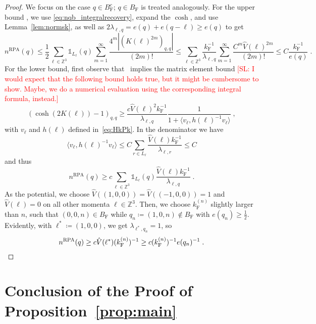 \documentclass[12pt,a4paper]{article}
\numberwithin{equation}{section}
\newcommand{\ZZZ}{\mathbb{Z}}
\newcommand{\1}{\mathbb{I}}
\newcommand{\F}{\mathrm{F}}
\newcommand{\RPA}{\mathrm{RPA}}
\newcommand{\Zstar}{\mathbb{Z}^3} %
\newcommand{\Z}{\mathbb{Z}}
\newcommand{\half}{\frac{1}{2}}
\theoremstyle{plain}
\theoremstyle{definition}
\theoremstyle{remark}
\theoremstyle{plain}
\theoremstyle{definition}
\theoremstyle{remark}
\begin{document}
\begin{proof}
We focus on the case $ q \in B_{\F}^c $; $ q \in B_{\F} $ is treated analogously. For the upper bound , we use \eqref{eq:nqb_integralrecovery}, expand the $ \cosh $, and use Lemma~\ref{lem:normsk}, as well as $ 2 \lambda_{\ell,q} = e(q) + e(q - \ell) \ge e(q) $ to get
\begin{equation}
	n^{\RPA}(q)
	\le \half \sum_{\ell \in \Zstar} \mathds{1}_{L_\ell}(q) \sum_{m=1}^{\infty} \frac{4^m |(K(\ell)^{2m})_{q,q}|}{(2m)!}
	\le \sum_{\ell \in \Zstar} \frac{k_{\F}^{-1}}{\lambda_{\ell,q}} \sum_{m=1}^{\infty} \frac{C^m \hat{V}(\ell)^{2m}}{(2m)!}
	\le C \frac{k_{\F}^{-1}}{e(q)} \;.
\end{equation}
For the lower bound, first observe that~\cite[Prop.~7.8]{CHN21} implies the matrix element bound \textcolor{red}{[SL: I would expect that the following bound holds true, but it might be cumbersome to show. Maybe, we do a numerical evaluation using the corresponding integral formula, instead.]} 
\begin{equation}
	(\cosh(2K(\ell)) - 1)_{q,q}
	\ge \frac{c \hat{V}(\ell)^2 k_{\F}^{-1}}{\lambda_{\ell,q}}
		\frac{1}{1 + \langle v_\ell, h(\ell)^{-1} v_\ell \rangle} \;,
\end{equation}
with $ v_\ell $ and $ h(\ell) $ defined in~\eqref{eq:HkPk}. In the denominator we have
\begin{equation}
	\langle v_\ell, h(\ell)^{-1} v_\ell \rangle \le C \sum_{r \in L_\ell} \frac{\hat{V}(\ell) k_{\F}^{-1}}{\lambda_{\ell,r}} \le C
\end{equation}
and thus
\begin{equation}
	n^{\RPA}(q)
	\ge c \sum_{\ell \in \Zstar} \mathds{1}_{L_\ell}(q)
		\frac{\hat{V}(\ell) k_{\F}^{-1}}{\lambda_{\ell,q}} \;.
\end{equation}
As the potential, we choose $ \hat{V}((1,0,0)) = \hat{V}((-1,0,0)) = 1 $ and $ \hat{V}(\ell) = 0 $ on all other momenta $ \ell \in \ZZZ^3 $. Then, we choose $ k_{\F}^{(n)} $ slightly larger than $ n $, such that $ (0,0,n) \in B_{\F} $ while $ q_n \coloneq (1,0,n) \notin B_{\F} $ with $ e(q_n) \ge \half $. Evidently, with $ \ell^* \coloneq (1,0,0) $, we get $ \lambda_{\ell^*, q_n} = 1 $, so
\[
	n^{\RPA}(q)
	\ge c \hat{V}(\ell^*) (k_{\F}^{(n)})^{-1}
	\ge c (k_{\F}^{(n)})^{-1} e(q_n)^{-1} \;. \qedhere
\]
\end{proof}



\section{Conclusion of the Proof of Proposition~\ref{prop:main}}
\label{sec:mainthmproof}
\end{document}
